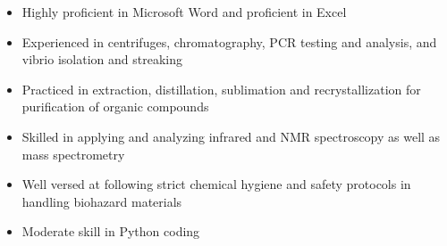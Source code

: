 \begin{itemize}
	\item Highly proficient in Microsoft Word and proficient in Excel
	\item Experienced in centrifuges, chromatography, PCR testing and analysis, and vibrio isolation and streaking
	\item Practiced in extraction, distillation, sublimation and recrystallization for purification of organic compounds
	\item Skilled in applying and analyzing infrared and NMR spectroscopy as well as mass spectrometry
	\item Well versed at following strict chemical hygiene and safety protocols in handling biohazard materials
	\item Moderate skill in Python coding
\end{itemize}